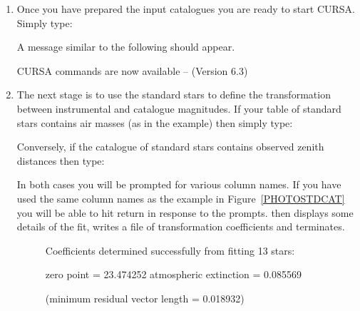 \documentclass[twoside,11pt,nolof]{starlink}
\begin{document}
\begin{enumerate}
\begin{description}
  \end{description}

  \item Once you have prepared the input catalogues you are ready to
   start CURSA.  Simply type:

\begin{terminalv}
\end{terminalv}

   A message similar to the following should appear.

\begin{terminalv}

   CURSA commands are now available -- (Version 6.3)

\end{terminalv}

  \item The next stage is to use the standard stars to define the
   transformation between instrumental and catalogue magnitudes.
   If your table of standard stars contains air masses (as in the
   example) then simply type:

\begin{terminalv}
\end{terminalv}

   Conversely, if the catalogue of standard stars contains observed
   zenith distances then type:

\begin{terminalv}
\end{terminalv}

   In both cases you will be prompted for various column names.  If
   you have used the same column names as the example in
   Figure~\ref{PHOTOSTDCAT} you will be able to hit return in response
   to the prompts.  
   then displays some details of the fit, writes a file of transformation
   coefficients and terminates.

\begin{figure}[htbp]

\begin{terminalv}

Coefficients determined successfully from fitting 13 stars:

 zero point = 23.474252
 atmospheric extinction = 0.085569

 (minimum residual vector length = 0.018932)


\end{terminalv}
\end{figure}
\end{enumerate}
\end{document}
